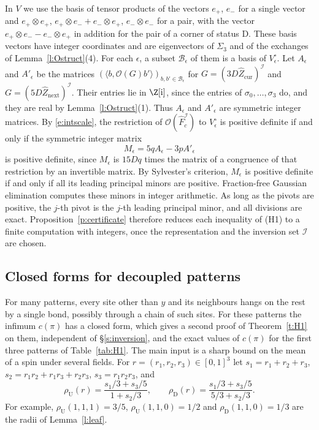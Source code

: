 In $V$ we use the basis of tensor products of the vectors $e_+$, $e_-$ for a single vector and $e_+ \otimes e_+$, $e_+ \otimes e_- + e_- \otimes e_+$, $e_- \otimes e_-$ for a pair, with the vector $e_+ \otimes e_- - e_- \otimes e_+$ in addition for the pair of a corner of status $\mathrm D$. These basis vectors have integer coordinates and are eigenvectors of $\Sigma_3$ and of the exchanges of Lemma~\ref{l:Ostruct}(4). For each $\epsilon$, a subset $\mathcal B_\epsilon$ of them is a basis of $V_\epsilon^{\circ}$. Let $A_\epsilon$ and $A'_\epsilon$ be the matrices $(\langle b, \mathcal O(G) b' \rangle)_{b, b' \in \mathcal B_\epsilon}$ for $G = (3 D \hat Z_{\mathrm{cur}})^{\mathcal I}$ and $G = (5 D \hat Z_{\mathrm{next}})^{\mathcal I}$. Their entries lie in $\Z[\mathrm i]$, since the entries of $\sigma_0, \dots, \sigma_3$ do, and they are real by Lemma~\ref{l:Ostruct}(1). Thus $A_\epsilon$ and $A'_\epsilon$ are symmetric integer matrices. By \eqref{e:intscale}, the restriction of $\mathcal O(\hat F_c^{\mathcal I})$ to $V_\epsilon^{\circ}$ is positive definite if and only if the symmetric integer matrix
\begin{equation}\label{e:Meps}
M_\epsilon = 5 q A_\epsilon - 3 p A'_\epsilon
\end{equation}
is positive definite, since $M_\epsilon$ is $15 D q$ times the matrix of a congruence of that restriction by an invertible matrix. By Sylvester's criterion, $M_\epsilon$ is positive definite if and only if all its leading principal minors are positive. Fraction-free Gaussian elimination \cite{Bar68} computes these minors in integer arithmetic. As long as the pivots are positive, the $j$-th pivot is the $j$-th leading principal minor, and all divisions are exact. Proposition~\ref{p:certificate} therefore reduces each inequality of (H1) to a finite computation with integers, once the representation and the inversion set $\mathcal I$ are chosen.

\subsection{Closed forms for decoupled patterns}\label{s:closed}

For many patterns, every site other than $y$ and its neighbours hangs on the rest by a single bond, possibly through a chain of such sites. For these patterns the infimum $c(\pi)$ has a closed form, which gives a second proof of Theorem~\ref{t:H1} on them, independent of \S\ref{s:inversion}, and the exact values of $c(\pi)$ for the first three patterns of Table~\ref{tab:H1}. The main input is a sharp bound on the mean of a spin under several fields. For $r = (r_1, r_2, r_3) \in [0, 1]^3$ let $s_1 = r_1 + r_2 + r_3$, $s_2 = r_1 r_2 + r_1 r_3 + r_2 r_3$, $s_3 = r_1 r_2 r_3$, and
\begin{equation}\label{e:rhoUD}
\rho_{\mathrm U}(r) = \frac{s_1/3 + s_3/5}{1 + s_2/3}, \qquad \rho_{\mathrm D}(r) = \frac{s_1/3 + s_3/5}{5/3 + s_2/3} .
\end{equation}
For example, $\rho_{\mathrm U}(1, 1, 1) = 3/5$, $\rho_{\mathrm U}(1, 1, 0) = 1/2$ and $\rho_{\mathrm D}(1, 1, 0) = 1/3$ are the radii of Lemma~\ref{l:leaf}.

